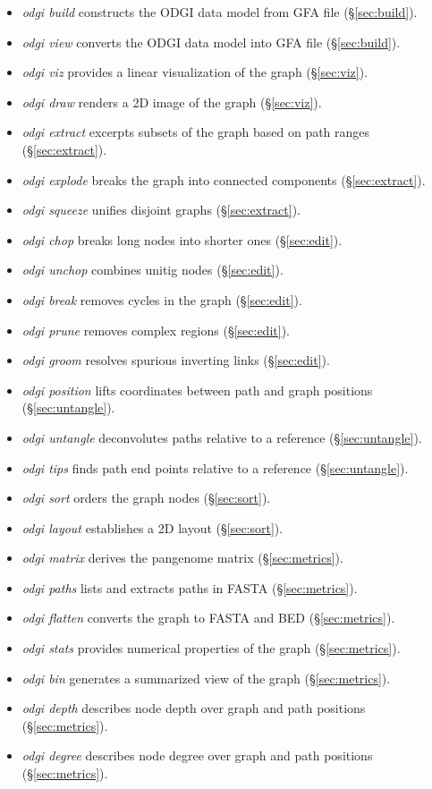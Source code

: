 \documentclass{bioinfo}
\begin{document}
\begin{itemize}
\item \textit{odgi build} constructs the ODGI data model from GFA file (\S\ref{sec:build}).
\item \textit{odgi view} converts the ODGI data model into GFA file (\S\ref{sec:build}).
\item \textit{odgi viz} provides a linear visualization of the graph (\S\ref{sec:viz}).
\item \textit{odgi draw} renders a 2D image of the graph (\S\ref{sec:viz}).
\item \textit{odgi extract} excerpts subsets of the graph based on path ranges (\S\ref{sec:extract}).
\item \textit{odgi explode} breaks the graph into connected components (\S\ref{sec:extract}).
\item \textit{odgi squeeze} unifies disjoint graphs (\S\ref{sec:extract}).
\item \textit{odgi chop} breaks long nodes into shorter ones (\S\ref{sec:edit}).
\item \textit{odgi unchop} combines unitig nodes (\S\ref{sec:edit}).
\item \textit{odgi break} removes cycles in the graph (\S\ref{sec:edit}).
\item \textit{odgi prune} removes complex regions (\S\ref{sec:edit}).
\item \textit{odgi groom} resolves spurious inverting links (\S\ref{sec:edit}).
\item \textit{odgi position} lifts coordinates between path and graph positions (\S\ref{sec:untangle}).%
\item \textit{odgi untangle} deconvolutes paths relative to a reference (\S\ref{sec:untangle}).
\item \textit{odgi tips} finds path end points relative to a reference (\S\ref{sec:untangle}).
\item \textit{odgi sort} orders the graph nodes (\S\ref{sec:sort}).
\item \textit{odgi layout} establishes a 2D layout (\S\ref{sec:sort}).
\item \textit{odgi matrix} derives the pangenome matrix (\S\ref{sec:metrics}).
\item \textit{odgi paths} lists and extracts paths in FASTA (\S\ref{sec:metrics}).
\item \textit{odgi flatten} converts the graph to FASTA and BED (\S\ref{sec:metrics}).
\item \textit{odgi stats} provides numerical properties of the graph (\S\ref{sec:metrics}).
\item \textit{odgi bin} generates a summarized view of the graph (\S\ref{sec:metrics}).
\item \textit{odgi depth} describes node depth over graph and path positions (\S\ref{sec:metrics}).
\item \textit{odgi degree} describes node degree over graph and path positions (\S\ref{sec:metrics}).
\end{itemize}
\end{document}
